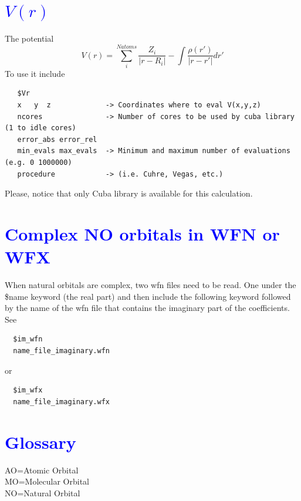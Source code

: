 \documentclass[10pt,a4paper]{article}
\newcommand{\tbl}[1]{{\textcolor{blue}{#1}}}
\begin{document}
{\section{\tbl{\textbf{$V(r)$}}}
The potential 
\begin{equation}
V(r)= \sum^{Natoms} _{i} \frac{Z_i}{|r-R_i|} - \int \frac{\rho(r')}{|r-r'|} dr'
\end{equation}
To use it include
\begin{verbatim}
   $Vr
   x   y  z             -> Coordinates where to eval V(x,y,z)
   ncores               -> Number of cores to be used by cuba library (1 to idle cores) 
   error_abs error_rel    
   min_evals max_evals  -> Minimum and maximum number of evaluations (e.g. 0 1000000)
   procedure            -> (i.e. Cuhre, Vegas, etc.)
\end{verbatim}
Please, notice that only Cuba library is available for this calculation. 
\section{\tbl{Complex NO orbitals in WFN or WFX}}}
When natural orbitals are complex, two wfn files need to be read. One under the \$name keyword (the real part) and then include the 
following keyword followed by the name of the wfn file that contains the imaginary part of the coefficients. See
\begin{verbatim}
  $im_wfn 
  name_file_imaginary.wfn
\end{verbatim}
or
\begin{verbatim}
  $im_wfx 
  name_file_imaginary.wfx
\end{verbatim}
\section*{\tbl{\textbf{Glossary}}}
AO=Atomic Orbital\\
MO=Molecular Orbital\\
NO=Natural Orbital
\end{document}
